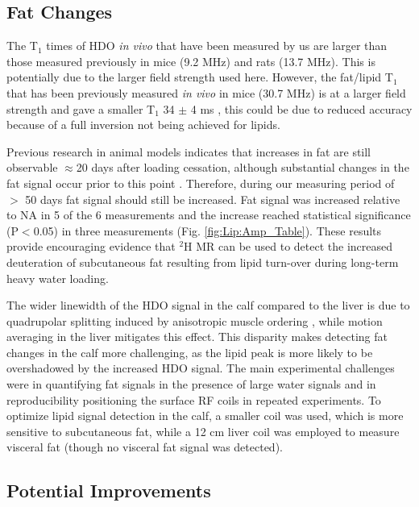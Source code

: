 \subsection{Fat Changes}

The T$_1$ times of \ac{HDO} \textit{in vivo} that have been measured by us are larger than those measured previously in mice \cite{Fung1979StudyWater} (9.2 MHz) and rats \cite{Block1987COMMUNICATIONSTissues} (13.7 MHz). This is potentially due to the larger field strength used here. However, the fat/lipid T$_1$ that has been previously measured \textit{in vivo} in mice (30.7 MHz) is at a larger field strength and gave a smaller T$_1$ 34 $\pm$ 4 ms \cite{Brereton1986PreliminarySpectroscopy}, this could be due to reduced accuracy because of a full inversion not being achieved for lipids. 

Previous research in animal models indicates that increases in fat are still observable $\approx$20 days after loading cessation, although substantial changes in the fat signal occur prior to this point \cite{Brereton1986PreliminarySpectroscopy}. Therefore, during our measuring period of $>$ 50 days fat signal should still be increased. Fat signal was increased relative to \ac{NA} in 5 of the 6 measurements and the increase reached statistical significance (P$<$0.05) in three measurements (Fig. \ref{fig:Lip:Amp_Table}). These results provide encouraging evidence that $^2$H MR can be used to detect the increased deuteration of subcutaneous fat resulting from lipid turn-over during long-term heavy water loading. 

The wider linewidth of the \ac{HDO} signal in the calf compared to the liver is due to quadrupolar splitting induced by anisotropic muscle ordering \cite{Gursan2022ResidualMuscle}, while motion averaging in the liver mitigates this effect. This disparity makes detecting fat changes in the calf more challenging, as the lipid peak is more likely to be overshadowed by the increased \ac{HDO} signal. The main experimental challenges were in quantifying fat signals in the presence of large water signals and in reproducibility positioning the surface RF coils in repeated experiments. To optimize lipid signal detection in the calf, a smaller coil was used, which is more sensitive to subcutaneous fat, while a 12 cm liver coil was employed to measure visceral fat (though no visceral fat signal was detected). 

\subsection{Potential Improvements}

